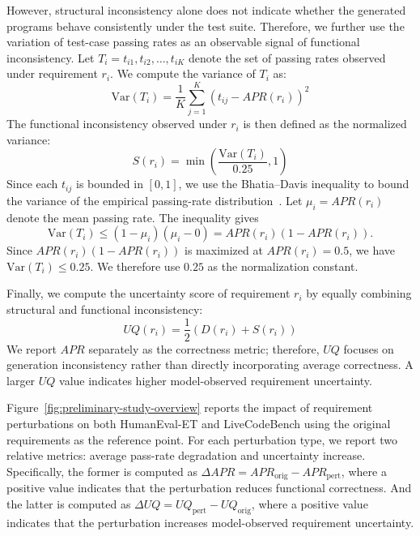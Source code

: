 However, structural inconsistency alone does not indicate whether the generated programs behave consistently under the test suite. Therefore, we further use the variation of test-case passing rates as an observable signal of functional inconsistency. Let $T_i={t_{i1},t_{i2},\ldots,t_{iK}}$ denote the set of passing rates observed under requirement $r_i$. We compute the variance of $T_i$ as:
\begin{equation}
\label{rq：passRateVariance}
\mathrm{Var}(T_i)=\frac{1}{K}\sum_{j=1}^{K}\left(t_{ij}-APR(r_i)\right)^2
\end{equation}
The functional inconsistency observed under $r_i$ is then defined as the normalized variance:
\begin{equation}
\label{eq:functionalInconsistency}
S(r_i)=\min\left(\frac{\mathrm{Var}(T_i)}{0.25}, 1\right)
\end{equation}
Since each $t_{ij}$ is bounded in $[0,1]$, we use the Bhatia--Davis inequality to bound the variance of the empirical passing-rate distribution~\cite{bhatia2000better}. Let $\mu_i=APR(r_i)$ denote the mean passing rate. The inequality gives
$$
\mathrm{Var}(T_i)\leq(1-\mu_i)(\mu_i-0)
=APR(r_i)(1-APR(r_i)).
$$
Since $APR(r_i)(1-APR(r_i))$ is maximized at $APR(r_i)=0.5$, we have $\mathrm{Var}(T_i)\leq0.25$. We therefore use $0.25$ as the normalization constant.


Finally, we compute the uncertainty score of requirement $r_i$ by equally combining structural and functional inconsistency:
\begin{equation}
\label{eq:uq}
UQ(r_i)=\frac{1}{2}\left(D(r_i)+S(r_i)\right)
\end{equation}
We report $APR$ separately as the correctness metric; therefore, $UQ$ focuses on generation inconsistency rather than directly incorporating average correctness. A larger $UQ$ value indicates higher model-observed requirement uncertainty.

Figure~\ref{fig:preliminary-study-overview} reports the impact of requirement perturbations on both HumanEval-ET and LiveCodeBench using the original requirements as the reference point. For each perturbation type, we report two relative metrics: average pass-rate degradation and uncertainty increase. Specifically, the former is computed as $\Delta APR=APR_{\mathrm{orig}}-APR_{\mathrm{pert}}$, where a positive value indicates that the perturbation reduces functional correctness. And the latter is computed as $\Delta UQ=UQ_{\mathrm{pert}}-UQ_{\mathrm{orig}}$, where a positive value indicates that the perturbation increases model-observed requirement uncertainty.


